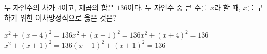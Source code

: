 두 자연수의 차가 $4$이고, 제곱의 합은 $136$이다. 두 자연수 중 큰 수를 $x$라 할 때, $x$를 구하기 위한 이차방정식으로 옳은 것은?
\begin{choicesii}{$x^2+(x-4)^2=136$}{$x^2+(x-1)^2=136$}{$x^2+(x+4)^2=136$}{$x^2+(x+1)^2=136$}{$(x-1)^2+(x+1)^2=136$}\end{choicesii}
